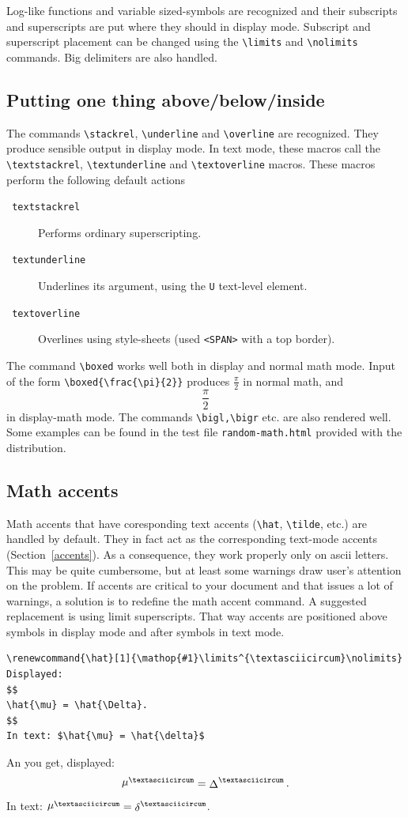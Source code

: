 Log-like functions and variable sized-symbols are recognized and their
subscripts and superscripts are put where they should in display mode.
Subscript and superscript placement can be changed using the
\verb+\limits+ and \verb+\nolimits+ commands.
Big delimiters are also handled.

\subsection{Putting one thing above/below/inside}

The commands \verb+\stackrel+,  \verb+\underline+ and \verb+\overline+
are recognized.
They produce sensible output in display mode.
In text mode, these macros call the \verb+\textstackrel+,
\verb+\textunderline+ and \verb+\textoverline+ macros.
These macros perform the following default actions
\begin{description}
\item[\texttt{ textstackrel}] Performs ordinary superscripting.
\item[\texttt{ textunderline}] Underlines its argument, using the
\verb+U+ text-level element.
\item[\texttt{ textoverline}] Overlines using style-sheets (used {\tt <SPAN>} with a top border). 
\end{description}

\index{\verb+\boxed+} The command \verb+\boxed+ works well both in display and normal math mode. Input of the form \verb+\boxed{\frac{\pi}{2}}+ produces $\boxed{\frac{\pi}{2}}$ in normal math, and 
$$\boxed{\frac{\pi}{2}}$$
in display-math mode. The commands \verb+\bigl,\bigr+ etc. are also rendered well. Some examples can be found \ifhevea {}\else in the test file {\tt random-math.html} provided with the distribution\fi.

\subsection{Math accents}
Math accents that have coresponding text accents
(\verb+\hat+, \verb+\tilde+, etc.) are
handled\label{mathaccents} by default.  They in fact act as the
corresponding text-mode accents (Section~\ref{accents}).
As a consequence, they work properly only on ascii letters.
This may be quite cumbersome, but at least some warnings draw user's
attention on the problem.
If accents are critical to your document and that \hevea{} issues
a lot of warnings, a solution is to redefine the math accent command.
A suggested replacement is using limit superscripts.
That way accents are positioned above symbols in display mode and
after symbols in text mode.
\begin{verbatim}
\renewcommand{\hat}[1]{\mathop{#1}\limits^{\textasciicircum}\nolimits}
Displayed:
$$
\hat{\mu} = \hat{\Delta}.
$$
In text: $\hat{\mu} = \hat{\delta}$
\end{verbatim}
\ifhevea
An you get,
{\renewcommand{\hat}[1]{\mathop{#1}\limits^{\textasciicircum}\nolimits}
displayed:
$$
\hat{\mu} = \hat{\Delta}.
$$
In text: $\hat{\mu} = \hat{\delta}$.}

